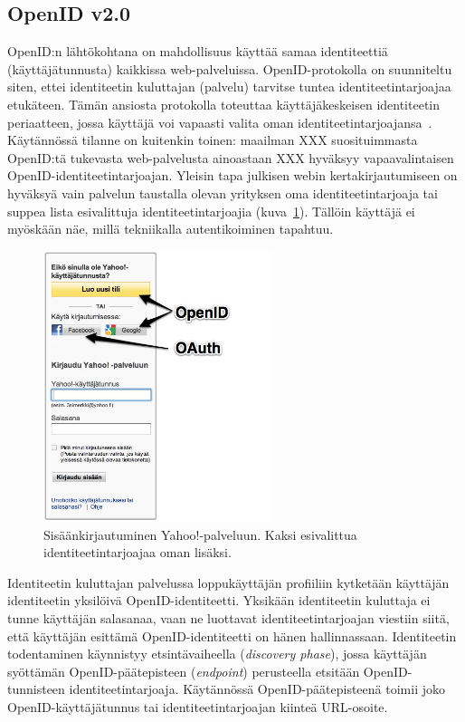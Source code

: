 \documentclass[finnish,gradu]{tktltiki}
\begin{document}
  \subsection{OpenID v2.0} %
  \label{sub:openid}

  OpenID:n lähtökohtana on mahdollisuus käyttää samaa identiteettiä (käyttäjätunnusta) kaikkissa web-palveluissa. OpenID-protokolla on suunniteltu siten, ettei identiteetin kuluttajan (palvelu) tarvitse tuntea identiteetintarjoajaa etukäteen. Tämän ansiosta protokolla toteuttaa käyttäjäkeskeisen identiteetin periaatteen, jossa käyttäjä voi vapaasti valita oman identiteetintarjoajansa~\cite{openid_recordon_2009}. Käytännössä tilanne on kuitenkin toinen: maailman XXX suosituimmasta OpenID:tä tukevasta web-palvelusta ainoastaan XXX hyväksyy vapaavalintaisen OpenID-identiteetintarjoajan. Yleisin tapa julkisen webin kertakirjautumiseen on hyväksyä vain palvelun taustalla olevan yrityksen oma identiteetintarjoaja tai suppea lista esivalittuja identiteetintarjoajia (kuva~\ref{fig:yahoo_login}). Tällöin käyttäjä ei myöskään näe, millä tekniikalla autentikoiminen tapahtuu.

  \begin{figure}[h!]
    \centering
    \includegraphics[width=0.6\textwidth]{images/yahoo_login.jpg}
    \caption{Sisäänkirjautuminen Yahoo!-palveluun. Kaksi esivalittua identiteetintarjoajaa oman lisäksi.}
    \label{fig:yahoo_login}
  \end{figure}

  Identiteetin kuluttajan palvelussa loppukäyttäjän profiiliin kytketään käyttäjän identiteetin yksilöivä OpenID-identiteetti. Yksikään identiteetin kuluttaja ei tunne käyttäjän salasanaa, vaan ne luottavat identiteetintarjoajan viestiin siitä, että käyttäjän esittämä OpenID-identiteetti on hänen hallinnassaan.  Identiteetin todentaminen käynnistyy etsintävaiheella (\emph{discovery phase}), jossa käyttäjän syöttämän OpenID-päätepisteen (\emph{endpoint}) perusteella etsitään OpenID-tunnisteen identiteetintarjoaja. Käytännössä OpenID-päätepisteenä toimii joko OpenID-käyttäjätunnus tai identiteetintarjoajan kiinteä URL-osoite.
\end{document}

